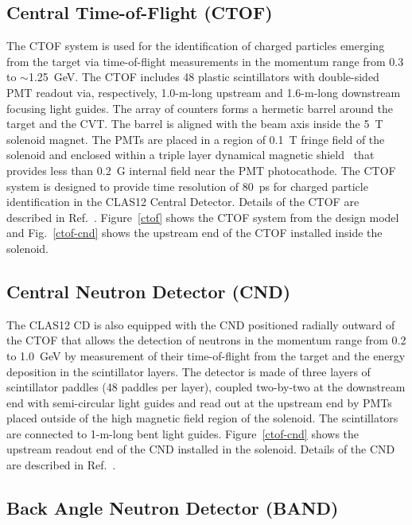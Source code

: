 \documentclass[final,3p]{elsarticle}
\begin{document}
\begin{twocolumn}
\subsection{Central Time-of-Flight (CTOF)}

The CTOF system is used for the identification of charged particles emerging from the target via time-of-flight
measurements in the momentum range from 0.3 to $\sim$1.25~GeV. The CTOF includes 48 plastic scintillators with
double-sided PMT readout via, respectively, 1.0-m-long upstream and 1.6-m-long downstream focusing light guides.
The array of counters forms a hermetic barrel around the target and the CVT. The barrel is aligned with the beam
axis inside the 5~T solenoid magnet. The PMTs are placed in a region of 0.1~T fringe field of the solenoid and
enclosed within a triple layer dynamical magnetic shield~\cite{Baturin:2012zz} that provides less than 0.2~G
internal field near the PMT photocathode. The CTOF system is designed to provide time resolution of 80~ps for
charged particle identification in the CLAS12 Central Detector. Details of the CTOF are described in
Ref.~\cite{ctof-nim}. Figure~\ref{ctof} shows the CTOF system from the design model and Fig.~\ref{ctof-cnd}
shows the upstream end of the CTOF installed inside the solenoid.

\subsection{Central Neutron Detector (CND)}

The CLAS12 CD is also equipped with the CND positioned radially outward of the CTOF that allows the detection
of neutrons in the momentum range from 0.2 to 1.0~GeV by measurement of their time-of-flight from the target
and the energy deposition in the scintillator layers. The detector is made of three layers of scintillator paddles
(48 paddles per layer), coupled two-by-two at the downstream end with semi-circular light guides and read out at
the upstream end by PMTs placed outside of the high magnetic field region of the solenoid. The scintillators are
connected to 1-m-long bent light guides. Figure~\ref{ctof-cnd} shows the upstream readout end of the
CND installed in the solenoid. Details of the CND are described in Ref.~\cite{cnd-nim}.

\subsection{Back Angle Neutron Detector (BAND)}


\end{twocolumn}
\end{document}
